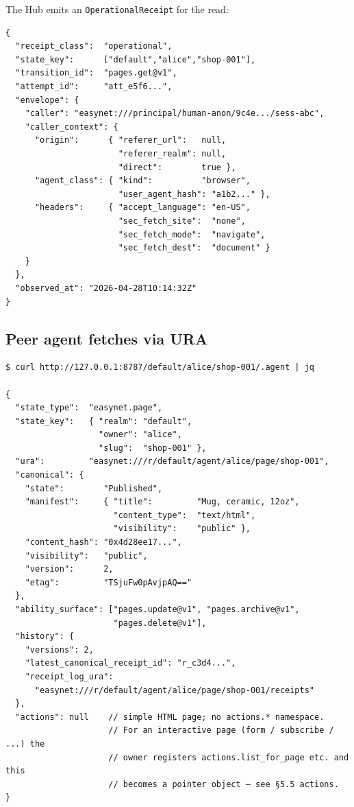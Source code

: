 \documentclass[11pt,a4paper]{article}
\theoremstyle{definition}
\begin{document}
\noindent The Hub emits an \texttt{OperationalReceipt} for the
read:

\begin{lstlisting}
{
  "receipt_class":  "operational",
  "state_key":      ["default","alice","shop-001"],
  "transition_id":  "pages.get@v1",
  "attempt_id":     "att_e5f6...",
  "envelope": {
    "caller": "easynet:///principal/human-anon/9c4e.../sess-abc",
    "caller_context": {
      "origin":      { "referer_url":   null,
                       "referer_realm": null,
                       "direct":        true },
      "agent_class": { "kind":          "browser",
                       "user_agent_hash": "a1b2..." },
      "headers":     { "accept_language": "en-US",
                       "sec_fetch_site":  "none",
                       "sec_fetch_mode":  "navigate",
                       "sec_fetch_dest":  "document" }
    }
  },
  "observed_at": "2026-04-28T10:14:32Z"
}
\end{lstlisting}

\subsection{Peer agent fetches via URA}

\begin{lstlisting}
$ curl http://127.0.0.1:8787/default/alice/shop-001/.agent | jq

{
  "state_type":  "easynet.page",
  "state_key":   { "realm": "default",
                   "owner": "alice",
                   "slug":  "shop-001" },
  "ura":         "easynet:///r/default/agent/alice/page/shop-001",
  "canonical": {
    "state":        "Published",
    "manifest":     { "title":         "Mug, ceramic, 12oz",
                      "content_type":  "text/html",
                      "visibility":    "public" },
    "content_hash": "0x4d28ee17...",
    "visibility":   "public",
    "version":      2,
    "etag":         "TSjuFw0pAvjpAQ=="
  },
  "ability_surface": ["pages.update@v1", "pages.archive@v1",
                      "pages.delete@v1"],
  "history": {
    "versions": 2,
    "latest_canonical_receipt_id": "r_c3d4...",
    "receipt_log_ura":
      "easynet:///r/default/agent/alice/page/shop-001/receipts"
  },
  "actions": null    // simple HTML page; no actions.* namespace.
                     // For an interactive page (form / subscribe / ...) the
                     // owner registers actions.list_for_page etc. and this
                     // becomes a pointer object — see §5.5 actions.
}
\end{lstlisting}
\end{document}
